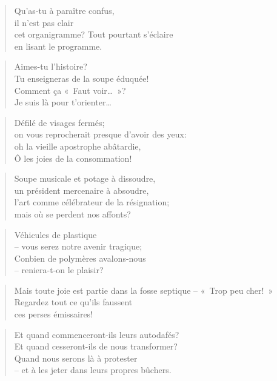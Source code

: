   \begin{verse}
    Qu’as-tu à paraître confus,\\
    il n’est pas clair\\
    cet organigramme? Tout pourtant s’éclaire\\
    en lisant le programme.
  \end{verse}
  \begin{verse}
    Aimes-tu l’histoire?\\
    Tu enseigneras de la soupe éduquée!\\
    Comment ça «~Faut voir…~»?\\
    Je suis là pour t’orienter…
  \end{verse}
  \begin{verse}
    Défilé de visages fermés;\\
    on vous reprocherait presque d’avoir des yeux:\\
    oh la vieille apostrophe abâtardie,\\
    Ô les joies de la consommation!
  \end{verse}
  \begin{verse}
    Soupe musicale et potage à dissoudre,\\
    un président mercenaire à absoudre,\\
    l’art comme célébrateur de la résignation;\\
    mais où se perdent nos affonts?
  \end{verse}
  \begin{verse}
    Véhicules de plastique\\
    -- vous serez notre avenir tragique;\\
    Conbien de polymères avalons-nous\\
    -- reniera-t-on le plaisir?
  \end{verse}
  \begin{verse}
    Mais toute joie est partie dans la fosse septique -- «~Trop peu cher!~»\\
    Regardez tout ce qu’ils faussent\\
    ces perses émissaires!
  \end{verse}
  \begin{verse}
    Et quand commenceront-ils leurs autodafés?\\
    Et quand cesseront-ils de nous transformer?\\
    Quand nous serons là à protester\\
    -- et à les jeter dans leurs propres bûchers.
  \end{verse}
